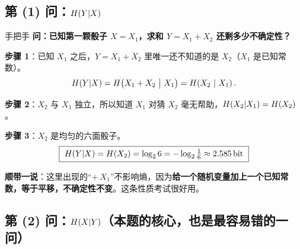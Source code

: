 \documentclass[11pt,a4paper]{ctexart}
\begin{document}
\subsection{第 (1) 问：$H\!\left(Y|X\right)$}

\begin{calc}{手把手}
\textbf{问：已知第一颗骰子 $X=X_1$，求和 $Y=X_1+X_2$ 还剩多少不确定性？}

\textbf{步骤 1}：已知 $X_1$ 之后，$Y=X_1+X_2$ 里唯一还不知道的是 $X_2$（$X_1$ 是已知常数）。
\[
\Hx{Y|X}=\Hx{X_1+X_2\ \big|\ X_1}=\Hx{X_2\ |\ X_1}.
\]

\textbf{步骤 2}：$X_2$ 与 $X_1$ 独立，所以知道 $X_1$ 对猜 $X_2$ 毫无帮助，$H\!\left(X_2|X_1\right)=H\!\left(X_2\right)$。

\textbf{步骤 3}：$X_2$ 是均匀的六面骰子。
\[
\boxed{\ \Hx{Y|X}=\Hx{X_2}=\lb6=-\lb\tfrac16\approx2.585\bit\ }
\]

\textbf{顺带一说}：这里出现的“$+\ X_1$”不影响熵，因为\textbf{给一个随机变量加上一个已知常数，等于平移，不确定性不变}。这条性质考试很好用。
\end{calc}

\subsection{第 (2) 问：$H\!\left(X|Y\right)$（本题的核心，也是最容易错的一问）}
\end{document}
